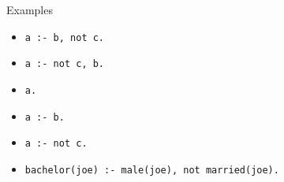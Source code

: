 \begin{frame}{Examples}
  \begin{itemize}
  \item<1-> \lstinline{a :- b, not c.}
    \smallskip
  \item<2-> \lstinline{a :- not c, b.}
    \medskip
  \item<3-> \lstinline{a.}
  \item<3-> \lstinline{a :- b.}
  \item<3-> \lstinline{a :- not c.}
    \medskip
  \item<4-> \lstinline{bachelor(joe) :- male(joe), not married(joe).}
  \end{itemize}
\end{frame}
%
